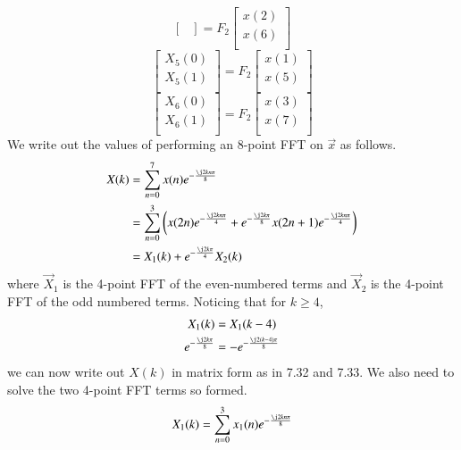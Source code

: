 \documentclass[journal,12pt,twocolumn]{IEEEtran}
\renewcommand\thesection{\arabic{section}}
\begin{document}
\begin{enumerate}[label=\thesection.\arabic*
	,ref=\thesection.\theenumi]
\begin{enumerate}[label=\arabic*.,ref=\thesection.\theenumi]
\begin{equation}
\begin{bmatrix}
		\end{bmatrix}
		= F_{2}
		\begin{bmatrix}
			x(2) \\ 
			x(6) \\ 
		\end{bmatrix}
	\end{equation}
	\begin{equation}
		\begin{bmatrix}
			X_{5}(0) \\ 
			X_{5}(1)\\ 
		\end{bmatrix}
		= F_{2}
		\begin{bmatrix}
			x(1) \\ 
			x(5) \\ 
		\end{bmatrix}
	\end{equation}
	\begin{equation}
		\begin{bmatrix}
			X_{6}(0) \\ 
			X_{6}(1)\\ 
		\end{bmatrix}
		= F_{2}
		\begin{bmatrix}
			x(3) \\ 
			x(7) \\ 
		\end{bmatrix}
	\end{equation}
\solution We write out the values of performing an 8-point FFT on $\vec{x}$ as follows.
\begin{align}
	X(k) &= \sum_{n = 0}^{7}x(n)e^{-\frac{\j2kn\pi}{8}} \\
	&= \sum_{n = 0}^{3}\brak{x(2n)e^{-\frac{\j2kn\pi}{4}} + e^{-\frac{\j2k\pi}{8}}x(2n + 1)e^{-\frac{\j2kn\pi}{4}}} \\
	&= X_1(k) + e^{-\frac{\j2k\pi}{4}}X_2(k) 
\end{align}
where $\vec{X}_1$ is the 4-point FFT of the even-numbered terms and $\vec{X}_2$ is the 4-point FFT of the odd numbered terms. Noticing that for $k \geq 4$,
\begin{align}
	X_1(k) &= X_1(k - 4) \\
	e^{-\frac{\j2k\pi}{8}} &= -e^{-\frac{\j2(k - 4)\pi}{8}}
\end{align}
we can now write out $X(k)$ in matrix form as in 7.32 and 7.33. We also need to solve the two 4-point FFT terms so formed.
\begin{equation}
	X_1(k) = \sum_{n = 0}^{3}x_1(n)e^{-\frac{\j2kn\pi}{8}}
\end{equation}

\end{enumerate}
\end{enumerate}
\end{document}
